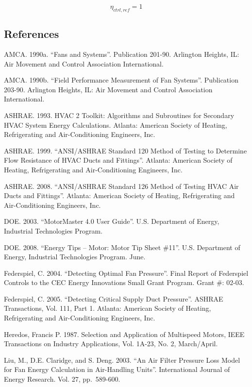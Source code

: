 \begin{equation}
\eta_{ctrl,ref} = 1
\label{eq:eta_ctrl_calculation}
\end{equation}

\subsection{References}\label{references-002}

AMCA. 1990a. ``Fans and Systems''. Publication 201-90. Arlington Heights, IL: Air Movement and Control Association International.

AMCA. 1990b. ``Field Performance Measurement of Fan Systems''. Publication 203-90. Arlington Heights, IL: Air Movement and Control Association International.

ASHRAE. 1993. HVAC 2 Toolkit: Algorithms and Subroutines for Secondary HVAC System Energy Calculations. Atlanta: American Society of Heating, Refrigerating and Air-Conditioning Engineers, Inc.

ASHRAE. 1999. ``ANSI/ASHRAE Standard 120 Method of Testing to Determine Flow Resistance of HVAC Ducts and Fittings''. Atlanta: American Society of Heating, Refrigerating and Air-Conditioning Engineers, Inc.

ASHRAE. 2008. ``ANSI/ASHRAE Standard 126 Method of Testing HVAC Air Ducts and Fittings''. Atlanta: American Society of Heating, Refrigerating and Air-Conditioning Engineers, Inc.

DOE. 2003. ``MotorMaster 4.0 User Guide''. U.S. Department of Energy, Industrial Technologies Program.

DOE. 2008. ``Energy Tips -- Motor: Motor Tip Sheet \#11''. U.S. Department of Energy, Industrial Technologies Program. June.

Federspiel, C. 2004. ``Detecting Optimal Fan Pressure''. Final Report of Federspiel Controls to the CEC Energy Innovations Small Grant Program. Grant \#: 02-03.

Federspiel, C. 2005. ``Detecting Critical Supply Duct Pressure''. ASHRAE Transactions, Vol. 111, Part 1. Atlanta: American Society of Heating, Refrigerating and Air-Conditioning Engineers, Inc.

Heredos, Francis P. 1987. Selection and Application of Multispeed Motors, IEEE Transactions on Industry Applications, Vol. 1A-23, No. 2, March/April.

Liu, M., D.E. Claridge, and S. Deng. 2003. ``An Air Filter Pressure Loss Model for Fan Energy Calculation in Air-Handling Units''. International Journal of Energy Research. Vol. 27, pp.~589-600.

